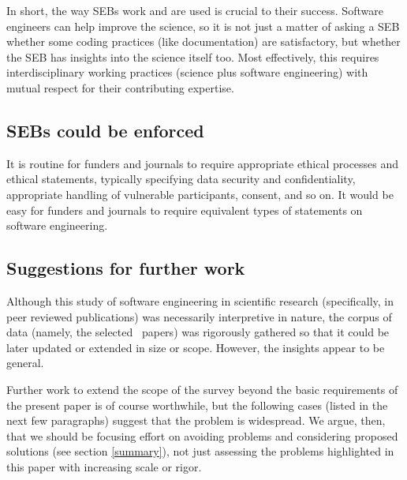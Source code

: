 \begin{change}
In short, the way SEBs work and are used is crucial to their success. Software engineers can help improve the science, so it is not just a matter of asking a SEB  whether some coding practices (like documentation) are satisfactory, but whether the SEB has insights into the science itself too. Most effectively, this requires interdisciplinary working practices (science plus software engineering) with mutual respect for their contributing expertise.

\subsection{SEBs could be enforced}
It is routine for funders and journals to require appropriate ethical processes and ethical statements, typically specifying data security and confidentiality, appropriate handling of vulnerable participants, consent, and so on. It would be easy for funders and journals to require equivalent types of statements on software engineering.

\end{change}

\subsection{Suggestions for further work}
Although this study of software engineering in scientific research (specifically, in peer reviewed publications) was necessarily interpretive in nature, the corpus of data (namely, the selected \the\dataN\ papers) was rigorously gathered so that it could be later updated or extended in size or scope. However, the insights appear to be general.

Further work to extend the scope of the survey beyond the basic requirements of the present paper is of course worthwhile, but the following cases (listed in the next few paragraphs) suggest that the problem is widespread. We argue, then, that we should be focusing effort on avoiding problems and considering proposed solutions (see section \ref{summary}), not just assessing the problems highlighted in this paper with increasing scale or rigor. 

